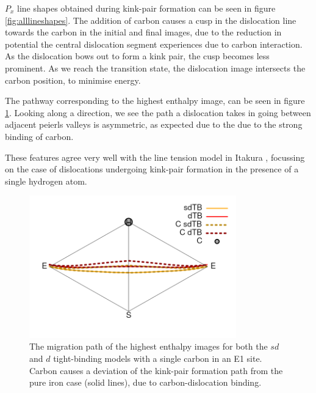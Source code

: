 \documentclass[a4paper,11pt]{article}
\numberwithin{equation}{chapter}
\numberwithin{listing}{chapter}
\begin{document}
\(P_x\) line shapes obtained during kink-pair formation can be seen in figure
\ref{fig:alllineshapes}. The addition of carbon causes a cusp in the
dislocation line towards the carbon in the initial and final images, due to
the reduction in potential the central dislocation segment experiences due
to carbon interaction. As the dislocation bows out to form a kink pair, the
cusp becomes less prominent. As we reach the transition state, the dislocation
image intersects the carbon position, to minimise energy.

The pathway corresponding to the highest enthalpy image, can be seen in
figure \ref{fig:pathwaysinglec}. Looking along a direction, we see the path a
dislocation takes in going between adjacent peierls valleys is asymmetric,
as expected due to the due to the strong binding of carbon.

These features agree very well with the line tension model in Itakura
\cite{itakura13_effec_hydrog_atoms_screw_disloc}, focussing on the case of
dislocations undergoing kink-pair formation in the presence of a single
hydrogen atom.

\begin{figure}[htbp]
\centering
\includegraphics[width=0.8\textwidth]{iron/Images/pathway_single_carbon_sd_d.png}
\caption{The migration path of the highest enthalpy images for both the \(sd\) and \(d\) tight-binding models with a single carbon in an E1 site. Carbon causes a deviation of the kink-pair formation path from the pure iron case (solid lines), due to carbon-dislocation binding. \label{fig:pathwaysinglec}}
\end{figure}
\end{document}
